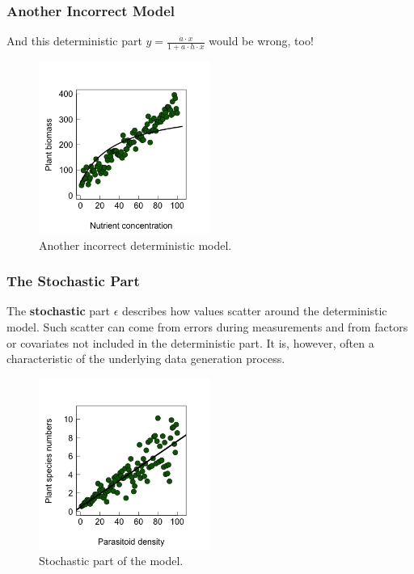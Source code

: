 \documentclass{beamer}
\begin{document}
\begin{frame}
  \frametitle{Another Incorrect Model}
  \begin{block}{}
    And this deterministic part $y = \frac{a \cdot x}{1 + a \cdot h \cdot x}$ would be wrong, too!
  \end{block}
  
  \begin{figure}[h]
    \centering
    \includegraphics[width=0.5\textwidth]{lectures/day_2_LM_refresh_I/figures/unnamed-chunk-8-1.png} 
    \caption{Another incorrect deterministic model.}
  \end{figure}
\end{frame}

\begin{frame}
  \frametitle{The Stochastic Part}
      The \textbf{stochastic} part $\epsilon$ describes how values scatter around the deterministic model. \small Such scatter can come from errors during measurements and from factors or covariates not included in the deterministic part. It is, however, often a characteristic of the underlying data generation process.
  
  \begin{figure}[h]
    \centering
    \includegraphics[width=0.5\textwidth]{lectures/day_2_LM_refresh_I/figures/unnamed-chunk-9-1.png} 
    \caption{Stochastic part of the model.}
  \end{figure}
\end{frame}
\end{document}
